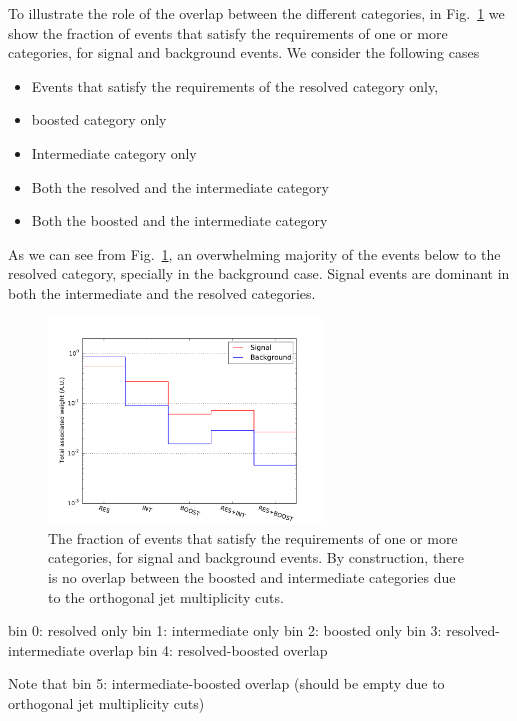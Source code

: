 To illustrate the role of the overlap between the different categories, in
Fig.~\ref{fig:categorisationHisto} we show the fraction of events that satisfy the requirements
of one or more categories, for signal and background events.
%
We consider the following cases
\begin{itemize}
\item Events that satisfy the requirements of the resolved category only,
\item boosted category only
\item Intermediate category only
\item Both the resolved and the intermediate category
  \item Both the boosted and the intermediate category
\end{itemize}
As we can see from Fig.~\ref{fig:categorisationHisto}, an overwhelming majority of the events
below to the resolved category, specially in the background case.
%
Signal events are dominant in both the intermediate and the resolved categories.

\begin{figure}[t]
\begin{center}
\includegraphics[width=0.65\textwidth]{plots/overlap_categories_C1.pdf}
\caption{\small The fraction of events that satisfy the requirements
  of one or more categories, for signal and background events.
  By construction, there is no overlap between the boosted
  and intermediate categories due to the
   orthogonal jet multiplicity cuts.
}
\label{fig:categorisationHisto}
\end{center}
\end{figure}

bin 0: resolved only
bin 1: intermediate only
bin 2: boosted only
bin 3: resolved-intermediate overlap
bin 4: resolved-boosted overlap

Note that
bin 5: intermediate-boosted overlap (should be empty due to orthogonal jet multiplicity cuts) 

